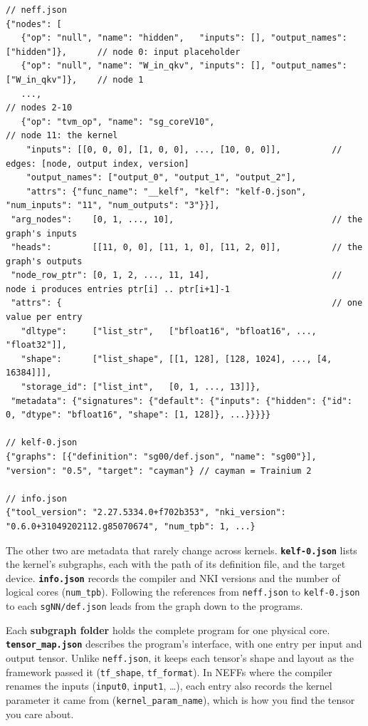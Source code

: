 \documentclass{article}
\newcommand{\code}[1]{\texttt{#1}}
\begin{document}
\begin{lstlisting}
// neff.json
{"nodes": [
   {"op": "null", "name": "hidden",   "inputs": [], "output_names": ["hidden"]},      // node 0: input placeholder
   {"op": "null", "name": "W_in_qkv", "inputs": [], "output_names": ["W_in_qkv"]},    // node 1
   ...,                                                                               // nodes 2-10
   {"op": "tvm_op", "name": "sg_coreV10",                                             // node 11: the kernel
    "inputs": [[0, 0, 0], [1, 0, 0], ..., [10, 0, 0]],          // edges: [node, output index, version]
    "output_names": ["output_0", "output_1", "output_2"],
    "attrs": {"func_name": "__kelf", "kelf": "kelf-0.json", "num_inputs": "11", "num_outputs": "3"}}],
 "arg_nodes":    [0, 1, ..., 10],                               // the graph's inputs
 "heads":        [[11, 0, 0], [11, 1, 0], [11, 2, 0]],          // the graph's outputs
 "node_row_ptr": [0, 1, 2, ..., 11, 14],                        // node i produces entries ptr[i] .. ptr[i+1]-1
 "attrs": {                                                     // one value per entry
   "dltype":     ["list_str",   ["bfloat16", "bfloat16", ..., "float32"]],
   "shape":      ["list_shape", [[1, 128], [128, 1024], ..., [4, 16384]]],
   "storage_id": ["list_int",   [0, 1, ..., 13]]},
 "metadata": {"signatures": {"default": {"inputs": {"hidden": {"id": 0, "dtype": "bfloat16", "shape": [1, 128]}, ...}}}}}

// kelf-0.json
{"graphs": [{"definition": "sg00/def.json", "name": "sg00"}], "version": "0.5", "target": "cayman"} // cayman = Trainium 2

// info.json
{"tool_version": "2.27.5334.0+f702b353", "nki_version": "0.6.0+31049202112.g85070674", "num_tpb": 1, ...}
\end{lstlisting}

The other two are metadata that rarely change across kernels. \textbf{\code{kelf-0.json}} lists the kernel's subgraphs, each with the path of its definition file, and the target device. \textbf{\code{info.json}} records the compiler and NKI versions and the number of logical cores (\code{num\_tpb}). Following the references from \code{neff.json} to \code{kelf-0.json} to each \code{sgNN/def.json} leads from the graph down to the programs.

Each \textbf{subgraph folder} holds the complete program for one physical core. \textbf{\code{tensor\_map.json}} describes the program's interface, with one entry per input and output tensor. Unlike \code{neff.json}, it keeps each tensor's shape and layout as the framework passed it (\code{tf\_shape}, \code{tf\_format}). In NEFFs where the compiler renames the inputs (\code{input0}, \code{input1}, \ldots), each entry also records the kernel parameter it came from (\code{kernel\_param\_name}), which is how you find the tensor you care about.
\end{document}
